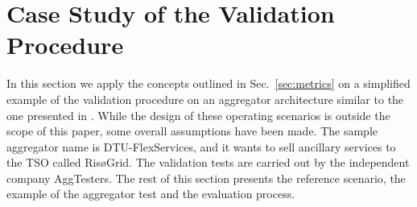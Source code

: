 \section{Case Study of the Validation Procedure }\label{sec:casestudy}

In this section we apply the concepts outlined in Sec.~\ref{sec:metrics} on a simplified example of the validation procedure on an aggregator architecture similar to the one presented in \cite{thavlov2013aggregation}. While the design of these operating scenarios is outside the scope of this paper, some overall assumptions have been made. The sample aggregator name is  DTU-FlexServices, and it wants to sell ancillary services to the TSO called RisøGrid. The validation tests are carried out by the independent company AggTesters. The rest of this section presents the reference scenario, the example of the aggregator test and the evaluation process. 

